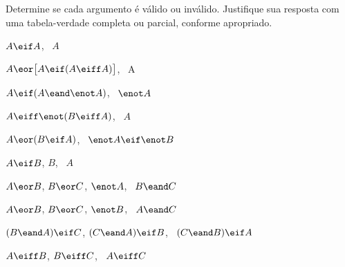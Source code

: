 \solutions
\problempart
\label{pr.TT.valid}
Determine se cada argumento é válido ou inválido. Justifique sua resposta com uma tabela-verdade completa ou parcial, conforme apropriado.
\begin{earg}
\item $A\eif A$, \therefore\ $A$ %
\item $A\eor\bigl[A\eif(A\eiff A)\bigr]$, \therefore\ A %
\item $A\eif(A\eand\enot A)$, \therefore\ $\enot A$ %
\item $A\eiff\enot(B\eiff A)$, \therefore\ $A$ %
\item $A\eor(B\eif A)$, \therefore\ $\enot A \eif \enot B$ %
\item $A\eif B$, $B$, \therefore\ $A$ %
\item $A\eor B$, $B\eor C$, $\enot A$, \therefore\ $B \eand C$ %
\item $A\eor B$, $B\eor C$, $\enot B$, \therefore\ $A \eand C$ %
\item $(B\eand A)\eif C$, $(C\eand A)\eif B$, \therefore\ $(C\eand B)\eif A$ %
\item $A\eiff B$, $B\eiff C$, \therefore\ $A\eiff C$ %
\end{earg}

